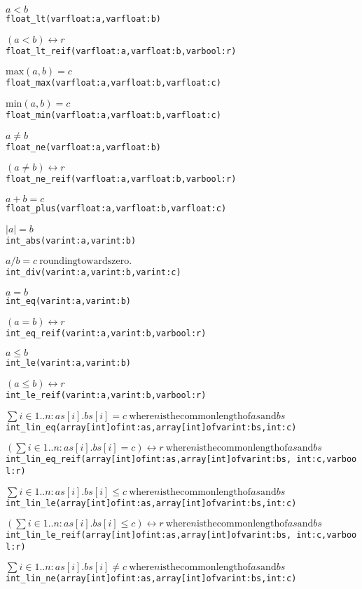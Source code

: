 \documentclass[a4paper]{article}
\begin{document}
\begin{alltt}
\(a < b\)
float_lt(var float: a, var float: b)

\((a < b) \leftrightarrow r\)
float_lt_reif(var float: a, var float: b, var bool: r)

\(\mathrm{max}(a, b) = c\)
float_max(var float: a, var float: b, var float: c)

\(\mathrm{min}(a, b) = c\)
float_min(var float: a, var float: b, var float: c)

\(a \neq b\)
float_ne(var float: a, var float: b)

\((a \neq b) \leftrightarrow r\)
float_ne_reif(var float: a, var float: b, var bool: r)

\(a+b = c\)
float_plus(var float: a, var float: b, var float: c)

\(|a| = b\)
int_abs(var int: a, var int: b)

\(a/b = c\
\mathrm{rounding towards zero.}\)
int_div(var int: a, var int: b, var int: c)

\(a = b\)
int_eq(var int: a, var int: b)

\((a = b) \leftrightarrow r\)
int_eq_reif(var int: a, var int: b, var bool: r)

\(a \leq b\)
int_le(var int: a, var int: b)

\((a \leq b) \leftrightarrow r\)
int_le_reif(var int: a, var int: b, var bool: r)

\(\sum i\in{}1..n: as[i].bs[i] = c\
\mathrm{ where} n \mathrm{is the common length of} as \mathrm{and} bs\)
int_lin_eq(array [int] of int: as, array [int] of var int: bs, int: c)

\((\sum i\in{}1..n: as[i].bs[i] = c) \leftrightarrow r\
\mathrm{ where} n \mathrm{is the common length of} as \mathrm{and} bs\)
int_lin_eq_reif(array [int] of int: as, array [int] of var int: bs, \
    int: c, var bool: r)

\(\sum i\in{}1..n: as[i].bs[i] \leq c\
\mathrm{ where} n \mathrm{is the common length of} as \mathrm{and} bs\)
int_lin_le(array [int] of int: as, array [int] of var int: bs, int: c)

\((\sum i\in{}1..n: as[i].bs[i] \leq c) \leftrightarrow r\
\mathrm{ where} n \mathrm{is the common length of} as \mathrm{and} bs\)
int_lin_le_reif(array [int] of int: as, array [int] of var int: bs, \
    int: c, var bool: r)

\(\sum i\in{}1..n: as[i].bs[i] \neq c\
\mathrm{ where} n \mathrm{is the common length of} as \mathrm{and} bs\)
int_lin_ne(array [int] of int: as, array [int] of var int: bs, int: c)


\end{alltt}
\end{document}
